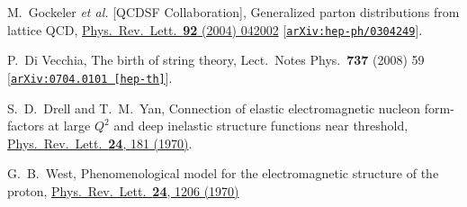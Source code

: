 \documentclass[aps,prd,preprint,groupedaddress]{revtex4-1}
\begin{document}
\begin{thebibliography}{99}
  M.~Gockeler {\it et al.} [QCDSF Collaboration],
  Generalized parton distributions from lattice QCD,
  \href{https://journals.aps.org/prl/abstract/10.1103/PhysRevLett.92.042002}{Phys.\ Rev.\ Lett.\  {\bf 92} (2004) 042002}
  [\href{https://arxiv.org/abs/hep-ph/0304249}{\tt arXiv:hep-ph/0304249}].
  
     
  P.~Di Vecchia,
  The birth of string theory,
  Lect.\ Notes Phys.\  {\bf 737} (2008) 59
  [\href{https://arxiv.org/abs/0704.0101}{\tt arXiv:0704.0101 [hep-th]}].
  
  
  S.~D.~Drell and T.~M.~Yan,
 Connection of elastic electromagnetic nucleon form-factors at large $Q^2$
 and deep inelastic structure functions near threshold,
  \href{http://prl.aps.org/abstract/PRL/v24/i4/p181_1}{Phys.\ Rev.\ Lett.\  {\bf 24}, 181 (1970)}.
 

  G.~B.~West,
  Phenomenological model for the electromagnetic structure of the proton,
  \href{http://prl.aps.org/abstract/PRL/v24/i21/p1206_1}{Phys.\ Rev.\ Lett.\  {\bf 24}, 1206 (1970)}
  
  

 \end{thebibliography}
 
\end{document}
